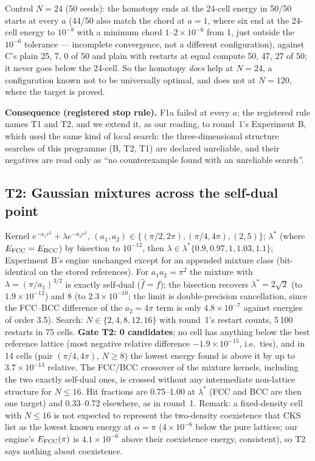 Control $N=24$ (50 seeds): the homotopy ends at the 24-cell energy in 50/50 starts at every $a$ (44/50 also match the chord at
$a=1$, where six end at the 24-cell energy to $10^{-8}$ with a minimum chord $1$--$2\times10^{-6}$ from 1, just outside the
$10^{-6}$ tolerance --- incomplete convergence, not a different configuration), against C's plain 25, 7, 0 of 50 and plain
with restarts at equal compute 50, 47, 27 of 50; it never goes below the 24-cell. So the homotopy \emph{does} help at $N=24$, a
configuration known not to be universally optimal, and does not at $N=120$, where the target is proved.

\textbf{Consequence (registered stop rule).} F1a failed at every $a$; the registered rule names T1 and T2, and we extend it, as our
reading, to round~1's Experiment B, which used the same kind of local search: the three-dimensional structure searches of this
programme (B, T2, T1) are declared unreliable, and their negatives are read only as ``no counterexample found with an unreliable search''.

\subsection{T2: Gaussian mixtures across the self-dual point}
Kernel $e^{-a_1r^2}+\lambda e^{-a_2r^2}$, $(a_1,a_2)\in\{(\pi/2,2\pi),(\pi/4,4\pi),(2,5)\}$; $\lambda^*$ (where $E_{\rm FCC}=E_{\rm BCC}$)
by bisection to $10^{-12}$, then $\lambda\in\lambda^*\{0.9,0.97,1,1.03,1.1\}$; Experiment B's engine unchanged except for an appended
mixture class (bit-identical on the stored references). For $a_1a_2=\pi^2$ the mixture with $\lambda=(\pi/a_1)^{3/2}$ is exactly
self-dual ($\hat f=f$); the bisection recovers $\lambda^*=2\sqrt2$ (to $1.9\times10^{-12}$) and $8$ (to $2.3\times10^{-10}$; the
limit is double-precision cancellation, since the FCC--BCC difference of the $a_2=4\pi$ term is only $4.8\times10^{-7}$ against
energies of order 3.5). Search: $N\in\{2,4,8,12,16\}$ with round~1's restart counts, 5\,100 restarts in
75 cells. \textbf{Gate T2: 0 candidates}; no cell has anything below the best reference lattice (most negative
relative difference $-1.9\times10^{-15}$, i.e.\ ties), and in 14 cells (pair $(\pi/4,4\pi)$, $N\ge8$) the lowest energy found is
above it by up to $3.7\times10^{-13}$ relative. The FCC/BCC crossover of the mixture kernels, including the two exactly self-dual ones, is crossed without
any intermediate non-lattice structure for $N\le16$. Hit fractions are 0.75--1.00 at $\lambda^*$ (FCC and BCC are then one
target) and 0.33--0.72 elsewhere, as in round~1. Remark: a fixed-density cell with $N\le16$ is not expected to represent the two-density
coexistence that CKS list as the lowest known energy at $\alpha=\pi$ ($4\times10^{-6}$ below the pure lattices; our engine's $E_{\rm FCC}(\pi)$ is
$4.1\times10^{-6}$ above their coexistence energy, consistent), so T2 says nothing about coexistence.

